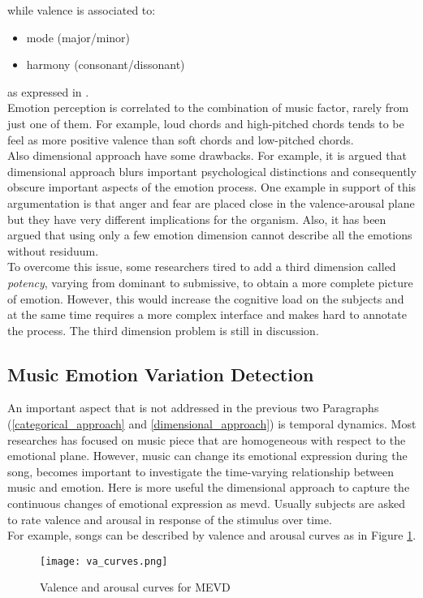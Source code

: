 while valence is associated to:
\begin{itemize}
	\item mode (major/minor)
	\item harmony (consonant/dissonant)
\end{itemize}
as expressed in \cite{gabrielsson2001influence}.
\\
Emotion perception is correlated to the combination of music factor, rarely from just one of them. For example, loud chords and high-pitched chords tends to be feel as more positive valence than soft chords and low-pitched chords.
\\ \indent
Also dimensional approach have some drawbacks. For example, it is argued that dimensional approach blurs important psychological distinctions and consequently obscure important aspects of the emotion process. One example in support of this argumentation is that anger and fear are placed close in the valence-arousal plane but they have very different implications for the organism. Also, it has been argued that using only a few emotion dimension cannot describe all the emotions without residuum.
\\
To overcome this issue, some researchers tired to add a third dimension called \textit{potency}, varying from dominant to submissive, to obtain a more complete picture of emotion. However, this would increase the cognitive load on the subjects and at the same time requires a more complex interface and makes hard to annotate the process. The third dimension problem is still in discussion.

\subsection{Music Emotion Variation Detection}
An important aspect that is not addressed in the previous two Paragraphs (\ref{categorical_approach} and \ref{dimensional_approach}) is temporal dynamics. Most researches has focused on music piece that are homogeneous with respect to the emotional plane. However, music can change its emotional expression during the song, becomes important to investigate the time-varying relationship between music and emotion. Here is more useful the dimensional approach to capture the continuous changes of emotional expression as \gls{mevd}. Usually subjects are asked to rate valence and arousal in response of the stimulus over time.
\\
For example, songs can be described by valence and arousal curves as in Figure \ref{fig:va_curves}.
\begin{figure}[h]
    \centering
    \texttt{[image: va\_curves.png]} 
	\caption{Valence and arousal curves for MEVD}
    \label{fig:va_curves}
\end{figure}

